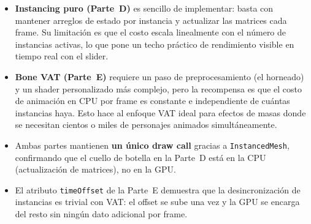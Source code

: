\documentclass[12pt,a4paper]{article}
\begin{document}
\begin{itemize}[leftmargin=*]
  \item \textbf{Instancing puro (Parte~D)} es sencillo de implementar: basta con
        mantener arreglos de estado por instancia y actualizar las matrices cada frame.
        Su limitación es que el costo escala linealmente con el número de instancias
        activas, lo que pone un techo práctico de rendimiento visible en tiempo real
        con el slider.

  \item \textbf{Bone VAT (Parte~E)} requiere un paso de preprocesamiento (el horneado)
        y un shader personalizado más complejo, pero la recompensa es que el costo de
        animación en CPU por frame es constante e independiente de cuántas instancias
        haya. Esto hace al enfoque VAT ideal para efectos de masas donde se necesitan
        cientos o miles de personajes animados simultáneamente.

  \item Ambas partes mantienen \textbf{un único draw call} gracias a
        \texttt{InstancedMesh}, confirmando que el cuello de botella en la Parte~D
        está en la CPU (actualización de matrices), no en la GPU.

  \item El atributo \texttt{timeOffset} de la Parte~E demuestra que la desincronización
        de instancias es trivial con VAT: el offset se sube una vez y la GPU se encarga
        del resto sin ningún dato adicional por frame.
\end{itemize}
\end{document}
